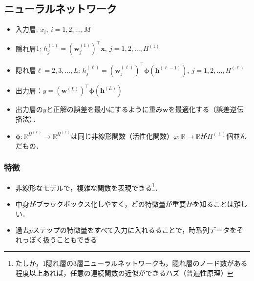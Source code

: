 \documentclass[a4paper,lualatex,ja=standard,oneside,fleqn]{bxjsarticle}
\begin{document}
\subsection{ニューラルネットワーク}
\begin{itemize}
  \item 入力層: $x_i,\ i=1,2,\ldots,M$
  \item 隠れ層$1$: $h^{(1)}_j=\left(\bm{w}^{(1)}_j\right)^\top\bm{x},\ j=1,2,\ldots,H^{(1)}$
  \item 隠れ層$\ell=2,3,\ldots,L$: $h^{(\ell)}_j=\left(\bm{w}^{(\ell)}_j\right)^\top\bm{\phi}\left(\bm{h}^{(\ell-1)}\right),\ j=1,2,\ldots,H^{(\ell)}$
  \item 出力層：$y=\left(\bm{w}^{(L)}\right)^\top\bm{\phi}\left(\bm{h}^{(L)}\right)$
\end{itemize}
\begin{itemize}
  \item 出力層の$y$と正解の誤差を最小にするように重み$\bm{w}$を最適化する（誤差逆伝播法）．
  \item $\bm{\phi}: \mathbb{R}^{H^{(\ell)}}\to\mathbb{R}^{H^{(\ell)}}$は同じ非線形関数（活性化関数）$\varphi:\mathbb{R}\to\mathbb{R}$が$H^{(\ell)}$個並んだもの．
\end{itemize}
\subsubsection*{特徴}
\begin{itemize}
  \item 非線形なモデルで，複雑な関数を表現できる\footnote{たしか，1隠れ層の3層ニューラルネットワークも，隠れ層のノード数がある程度以上あれば，任意の連続関数の近似ができるハズ（普遍性原理）}．
  \item 中身がブラックボックス化しやすく，どの特徴量が重要かを知ることは難しい．
  \item 過去$p$ステップの特徴量をすべて入力に入れるることで，時系列データをそれっぽく扱うこともできる
\end{itemize}
\end{document}
